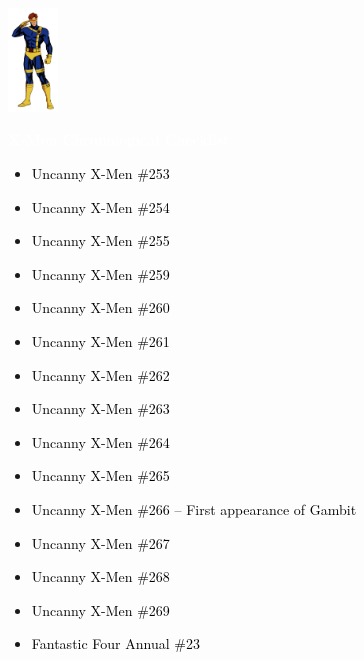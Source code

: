 \documentclass[12pt]{article}
\newcommand{\checkbox}{\raisebox{0.0ex}{\fbox{\rule{0ex}{1.5ex} \rule{1.5ex}{0ex}}}}
\begin{document}
\begin{center}
    \vspace*{2cm}
    \includegraphics[width=0.1\textwidth]{cyclops.png}
    \vspace{0.3cm}

    {\Huge \textbf{\textcolor{white}{X-Men Chronological Checklist}}}
\end{center}

\vspace{0.3cm}
\noindent
\begin{tcolorbox}[
  colback=white!95!gray,
  colframe=black,
  width=\textwidth,
  arc=4mm,
  auto outer arc,
  boxrule=0.8pt,
  left=8pt,right=8pt,top=8pt,bottom=8pt
]
\begin{itemize}[left=0pt,label={\checkbox}]
    \item \textcolor{black}{Uncanny X-Men \#253}
    \item \textcolor{black}{Uncanny X-Men \#254}
    \item \textcolor{black}{Uncanny X-Men \#255}
    \item \textcolor{black}{Uncanny X-Men \#259}
    \item \textcolor{black}{Uncanny X-Men \#260}
    \item \textcolor{black}{Uncanny X-Men \#261}
    \item \textcolor{black}{Uncanny X-Men \#262}
    \item \textcolor{black}{Uncanny X-Men \#263}
    \item \textcolor{black}{Uncanny X-Men \#264}
    \item \textcolor{black}{Uncanny X-Men \#265}
    \item \textcolor{black}{Uncanny X-Men \#266 – First appearance of Gambit}
    \item \textcolor{black}{Uncanny X-Men \#267}
    \item \textcolor{black}{Uncanny X-Men \#268}
    \item \textcolor{black}{Uncanny X-Men \#269}
    \item \textcolor{black}{Fantastic Four Annual \#23}
\end{itemize}
\end{tcolorbox}
\end{document}
